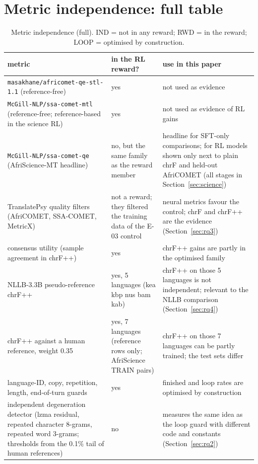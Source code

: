 \section{Metric independence: full table}\label{app:indep}

\begin{table}[t]
\centering\footnotesize
\setlength{\tabcolsep}{4pt}
\caption{Metric independence (full). IND = not in any reward; RWD = in the reward; LOOP = optimised by construction.}\label{tab:indep_full}
\begin{tabularx}{\linewidth}{@{}>{\raggedright\arraybackslash}X>{\raggedright\arraybackslash}X>{\raggedright\arraybackslash}X@{}}
\toprule
metric & in the RL reward? & use in this paper \\
\midrule
\texttt{masakhane/\allowbreak{}africomet-\allowbreak{}qe-\allowbreak{}stl-\allowbreak{}1.\allowbreak{}1} (reference-free) & yes & not used as evidence \\
\texttt{McGill-\allowbreak{}NLP/\allowbreak{}ssa-\allowbreak{}comet-\allowbreak{}mtl} (reference-free; reference-based in the science RL) & yes & not used as evidence of RL gains \\
\texttt{McGill-\allowbreak{}NLP/\allowbreak{}ssa-\allowbreak{}comet-\allowbreak{}qe} (AfriScience-MT headline) & no, but the same family as the reward member & headline for SFT-only comparisons; for RL models shown only next to plain chrF and held-out AfriCOMET (all stages in Section~\ref{sec:science}) \\
TranslatePsy quality filters (AfriCOMET, SSA-COMET, MetricX) & not a reward; they filtered the training data of the E-03 control & neural metrics favour the control; chrF and chrF++ are the evidence (Section~\ref{sec:rq3}) \\
consensus utility (sample agreement in chrF++) & yes & chrF++ gains are partly in the optimised family \\
NLLB-3.3B pseudo-reference chrF++ & yes, 5 languages (kea kbp nus bam kab) & chrF++ on those 5 languages is not independent; relevant to the NLLB comparison (Section~\ref{sec:rq4}) \\
chrF++ against a human reference, weight 0.35 & yes, 7 languages (reference rows only; AfriScience TRAIN pairs) & chrF++ on those 7 languages can be partly trained; the test sets differ \\
language-ID, copy, repetition, length, end-of-turn guards & yes & finished and loop rates are optimised by construction \\
independent degeneration detector (lzma residual, repeated character 8-grams, repeated word 3-grams; thresholds from the 0.1\% tail of human references) & no & measures the same idea as the loop guard with different code and constants (Section~\ref{sec:rq2}) \\

\end{tabularx}
\end{table}
